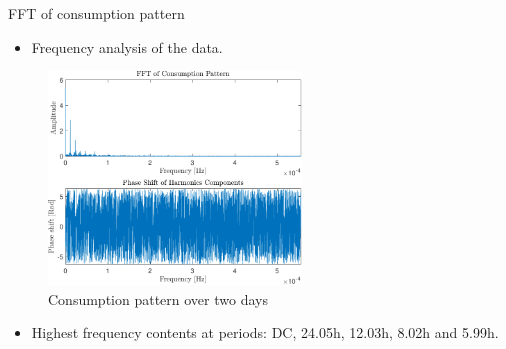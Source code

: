 	\begin{frame}{FFT of consumption pattern}
		\begin{itemize}
			\item Frequency analysis of the data. 
		\end{itemize}
	
		 \begin{figure}[h!]
			\centering
			\includegraphics[width=0.6\textwidth]{Topics/KalmanEstimator/Graphics/FFT.pdf}
			\caption{Consumption pattern over two days}
			\label{fig:FFT_Consumption_Patter}
		\end{figure}
	
	\begin{itemize}
		\item Highest frequency contents at periods: DC, 24.05h, 12.03h, 8.02h and 5.99h. 
	\end{itemize}

	\end{frame}

